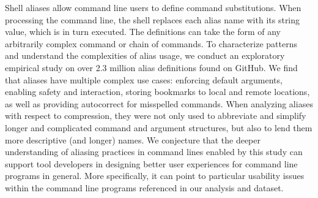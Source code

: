 Shell aliases allow command line users to define command substitutions.
When processing the command line, the shell replaces each alias name with its string value, which is in turn executed.
The definitions can take the form of any arbitrarily complex command or chain of commands.
To characterize patterns and understand the complexities of alias usage, we conduct an exploratory empirical study on over 2.3 million alias definitions found on GitHub.
We find that aliases have multiple complex use cases: enforcing default arguments, enabling safety and interaction, storing bookmarks to local and remote locations, as well as providing autocorrect for misspelled commands.
When analyzing aliases with respect to compression, they were not only used to abbreviate and simplify longer and complicated command and argument structures, but also to lend them more descriptive (and longer) names.
We conjecture that the deeper understanding of aliasing practices in command lines enabled by this study can support tool developers in designing better user experiences for command line programs in general.
More specifically, it can point to particular usability issues within the command line programs referenced in our analysis and dataset.